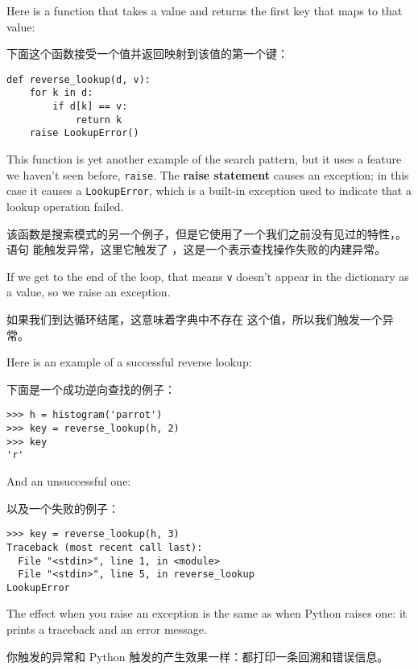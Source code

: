 Here is a function that takes a value and returns the first
key that maps to that value:

下面这个函数接受一个值并返回映射到该值的第一个键：

\begin{lstlisting}
def reverse_lookup(d, v):
    for k in d:
        if d[k] == v:
            return k
    raise LookupError()
\end{lstlisting}

%
This function is yet another example of the search pattern, but it
uses a feature we haven't seen before, {\tt raise}.  The
{\bf raise statement} causes an exception; in this case it causes a
{\tt LookupError}, which is a built-in exception used to indicate
that a lookup operation failed.

该函数是搜索模式的另一个例子，但是它使用了一个我们之前没有见过的特性，。  语句 能触发异常，这里它触发了 ，这是一个表示查找操作失败的内建异常。

  
 
 

If we get to the end of the loop, that means {\tt v}
doesn't appear in the dictionary as a value, so we raise an
exception.

如果我们到达循环结尾，这意味着字典中不存在  这个值，所以我们触发一个异常。

Here is an example of a successful reverse lookup:

下面是一个成功逆向查找的例子：

\begin{lstlisting}
>>> h = histogram('parrot')
>>> key = reverse_lookup(h, 2)
>>> key
'r'
\end{lstlisting}

%
And an unsuccessful one:

以及一个失败的例子：

\begin{lstlisting}
>>> key = reverse_lookup(h, 3)
Traceback (most recent call last):
  File "<stdin>", line 1, in <module>
  File "<stdin>", line 5, in reverse_lookup
LookupError
\end{lstlisting}

%
The effect when you raise an exception is the same as when
Python raises one: it prints a traceback and an error message.

你触发的异常和 Python 触发的产生效果一样：都打印一条回溯和错误信息。

